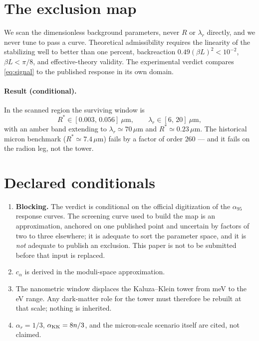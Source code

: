 \documentclass[11pt,a4paper]{article}
\begin{document}
\section{The exclusion map}

We scan the dimensionless background parameters, never $R$ or
$\lambda_r$ directly, and we never tune to pass a curve. Theoretical
admissibility requires the linearity of the stabilizing well to better
than one percent, backreaction $0.49(\beta L)^2<10^{-2}$,
$\beta L<\pi/8$, and effective-theory validity. The experimental
verdict compares \eqref{eq:signal} to the published response in its own
domain.

\paragraph{Result (conditional).} In the scanned region the surviving
window is
\begin{equation}
R^\ast\in[0.003,\,0.056]\ \mu\mathrm{m},\qquad
\lambda_r\in[6,\,20]\ \mu\mathrm{m},
\end{equation}
with an amber band extending to $\lambda_r\simeq70\,\mu$m and
$R^\ast\simeq0.23\,\mu$m. The historical micron benchmark
($R^\ast\simeq7.4\,\mu$m) fails by a factor of order $260$ --- and it
fails on the radion leg, not the tower.

\section{Declared conditionals}

\begin{enumerate}
\item \textbf{Blocking.} The verdict is conditional on the official
digitization of the $\alpha_{95}$ response curves. The screening curve
used to build the map is an approximation, anchored on one published
point and uncertain by factors of two to three elsewhere; it is
adequate to sort the parameter space, and it is \emph{not} adequate to
publish an exclusion. This paper is not to be submitted before that
input is replaced.
\item $c_\alpha$ is derived in the moduli-space approximation.
\item The nanometric window displaces the Kaluza--Klein tower from
meV to the eV range. Any dark-matter role for the tower must therefore
be rebuilt at that scale; nothing is inherited.
\item $\alpha_r=1/3$, $\alpha_{\rm KK}=8n/3$, and the micron-scale
scenario itself are cited, not claimed.
\end{enumerate}
\end{document}
